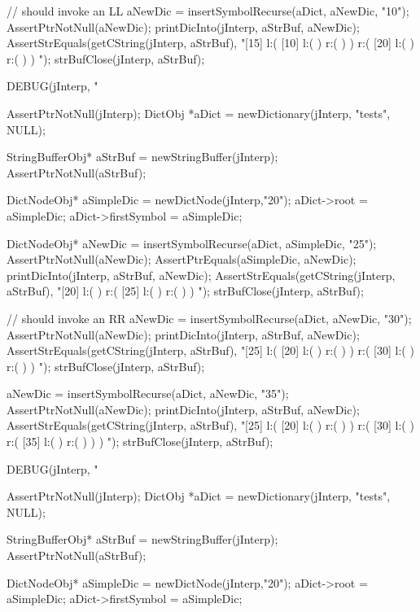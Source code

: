  // should invoke an LL
  aNewDic = insertSymbolRecurse(aDict, aNewDic, "10");
  AssertPtrNotNull(aNewDic);
  printDicInto(jInterp, aStrBuf, aNewDic);
  AssertStrEquals(getCString(jInterp, aStrBuf),
  "[15] l:( [10] l:(  ) r:(  )  ) r:( [20] l:(  ) r:(  )  ) ");
  strBufClose(jInterp, aStrBuf);
\stopCTest
\stopTestCase

\startCTest
  DEBUG(jInterp, "\n%

  AssertPtrNotNull(jInterp);
  DictObj *aDict = newDictionary(jInterp, "tests", NULL);

  StringBufferObj* aStrBuf = newStringBuffer(jInterp);
  AssertPtrNotNull(aStrBuf);
  
  DictNodeObj* aSimpleDic = newDictNode(jInterp,"20");
  aDict->root             = aSimpleDic;
  aDict->firstSymbol      = aSimpleDic;

  DictNodeObj* aNewDic = insertSymbolRecurse(aDict, aSimpleDic, "25");
  AssertPtrNotNull(aNewDic);
  AssertPtrEquals(aSimpleDic, aNewDic);
  printDicInto(jInterp, aStrBuf, aNewDic);
  AssertStrEquals(getCString(jInterp, aStrBuf),
  "[20] l:(  ) r:( [25] l:(  ) r:(  )  ) ");
  strBufClose(jInterp, aStrBuf);
  
  // should invoke an RR
  aNewDic = insertSymbolRecurse(aDict, aNewDic, "30");
  AssertPtrNotNull(aNewDic);
  printDicInto(jInterp, aStrBuf, aNewDic);
  AssertStrEquals(getCString(jInterp, aStrBuf),
  "[25] l:( [20] l:(  ) r:(  )  ) r:( [30] l:(  ) r:(  )  ) ");
  strBufClose(jInterp, aStrBuf);
  
  aNewDic = insertSymbolRecurse(aDict, aNewDic, "35");
  AssertPtrNotNull(aNewDic);
  printDicInto(jInterp, aStrBuf, aNewDic);
  AssertStrEquals(getCString(jInterp, aStrBuf),
  "[25] l:( [20] l:(  ) r:(  )  ) r:( [30] l:(  ) r:( [35] l:(  ) r:(  )  )  ) ");
  strBufClose(jInterp, aStrBuf);
\stopCTest
\stopTestCase

\startCTest
  DEBUG(jInterp, "\n%

  AssertPtrNotNull(jInterp);
  DictObj *aDict = newDictionary(jInterp, "tests", NULL);

  StringBufferObj* aStrBuf = newStringBuffer(jInterp);
  AssertPtrNotNull(aStrBuf);
  
  DictNodeObj* aSimpleDic = newDictNode(jInterp,"20");
  aDict->root             = aSimpleDic;
  aDict->firstSymbol      = aSimpleDic;

